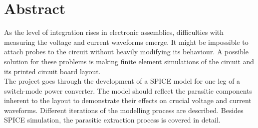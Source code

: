 \section{Abstract}

As the level of integration rises in electronic assemblies, difficulties with measuring the voltage and current waveforms emerge. It might be impossible to attach probes to the circuit without heavily modifying its behaviour. A possible solution for these problems is making finite element simulations of the circuit and its printed circuit board layout. \\

The project goes through the development of a SPICE model for one leg of a switch-mode power converter. The model should reflect the parasitic components inherent to the layout to demonstrate their effects on crucial voltage and current waveforms. Different iterations of the modelling process are described. Besides SPICE simulation, the parasitic extraction process is covered in detail.